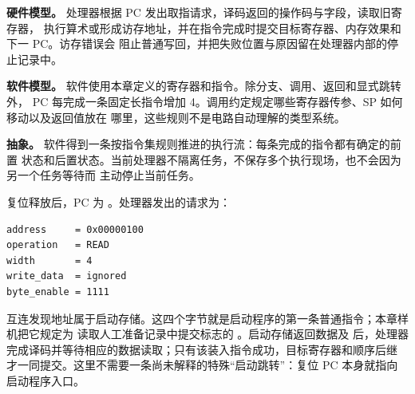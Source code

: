 \textbf{硬件模型。} 处理器根据 PC 发出取指请求，译码返回的操作码与字段，读取旧寄存器，
执行算术或形成访存地址，并在指令完成时提交目标寄存器、内存效果和下一 PC。访存错误会
阻止普通写回，并把失败位置与原因留在处理器内部的停止记录中。

\textbf{软件模型。} 软件使用本章定义的寄存器和指令。除分支、调用、返回和显式跳转外，
PC 每完成一条固定长指令增加 4。调用约定规定哪些寄存器传参、SP 如何移动以及返回值放在
哪里，这些规则不是电路自动理解的类型系统。

\textbf{抽象。} 软件得到一条按指令集规则推进的执行流：每条完成的指令都有确定的前置
状态和后置状态。当前处理器不隔离任务，不保存多个执行现场，也不会因为另一个任务等待而
主动停止当前任务。


复位释放后，PC 为 。处理器发出的请求为：

\begin{lstlisting}
address     = 0x00000100
operation   = READ
width       = 4
write_data  = ignored
byte_enable = 1111
\end{lstlisting}

互连发现地址属于启动存储。这四个字节就是启动程序的第一条普通指令；本章样机把它规定为
读取人工准备记录中提交标志的 。启动存储返回数据及  后，处理器
完成译码并等待相应的数据读取；只有该装入指令成功，目标寄存器和顺序后继
 才一同提交。这里不需要一条尚未解释的特殊“启动跳转”：复位 PC
本身就指向启动程序入口。

\begin{center}
\end{center}


